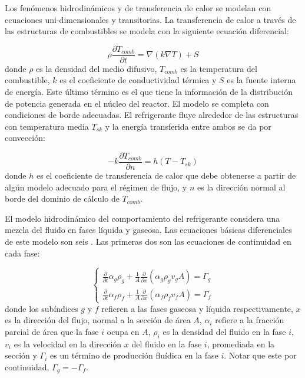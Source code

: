 Los fenómenos hidrodinámicos y de transferencia de calor se modelan con ecuaciones uni-dimensionales y transitorias.
La transferencia de calor a través de las estructuras de combustibles se modela con la siguiente ecuación diferencial:

\begin{equation}
\rho \frac{\partial T_{comb}}{\partial t} = \nabla \left ( k \nabla T \right )  + S
\label{relap-calor}
\end{equation}
donde $\rho$ es la densidad del medio difusivo,
$T_{comb}$ es la temperatura del combustible,
$k$ es el coeficiente de conductividad térmica y
$S$ es la fuente interna de energía.
Este último término es el que tiene la información de la distribución de potencia generada en el núcleo del reactor.
El modelo se completa con condiciones de borde adecuadas.
El refrigerante fluye alrededor de las estructuras con temperatura media $T_{sk}$ y la energía transferida entre ambos se da por convección:

\begin{equation}
-k \frac{\partial T_{comb}}{\partial n} = h \left ( T - T_{sk} \right )
\label{relap-conveccion}
\end{equation}
donde $h$ es el coeficiente de transferencia de calor que debe obtenerse a partir de algún modelo adecuado para el régimen de flujo,
y $n$ es la dirección normal al borde del dominio de cálculo de $T_{comb}$.

El modelo hidrodinámico del comportamiento del refrigerante considera una mezcla del fluido en fases líquida y gaseosa.
Las ecuaciones básicas diferenciales de este modelo son seis \cite{manual-relap-modelos}.
Las primeras dos son las ecuaciones de continuidad en cada fase:

\begin{equation}
\left \{
\begin{array}{r}
\frac{\partial} {\partial t} \alpha_g \rho_g + \frac{1}{A} \frac{\partial}{\partial x} \left (\alpha_g \rho_g v_g A \right ) = \Gamma_g \\
\frac{\partial} {\partial t} \alpha_f \rho_f + \frac{1}{A} \frac{\partial}{\partial x} \left (\alpha_f \rho_f v_f A \right ) = \Gamma_f
\end{array}
\right .
\label{relap-masa}
\end{equation}
donde los subíndices $g$ y $f$ refieren a las fases gaseosa y líquida respectivamente,
$x$ es la dirección del flujo, normal a la sección de área $A$,
$\alpha_i$ refiere a la fracción parcial de área que la fase $i$ ocupa en $A$,
$\rho_i$ es la densidad del fluido en la fase $i$,
$v_i$ es la velocidad en la dirección $x$ del fluido en la fase $i$, promediada en la sección y
$\Gamma_i$ es un término de producción fluídica en la fase $i$.
Notar que este por continuidad, $\Gamma_g = -\Gamma_f$.

